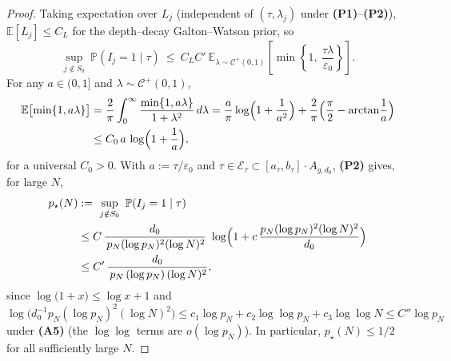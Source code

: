\documentclass[11pt]{article}
\theoremstyle{plain}
\theoremstyle{definition}
\theoremstyle{plain}
\begin{document}
\begin{proof}
Taking expectation over $L_j$ (independent of $(\tau,\lambda_j)$ under {\textbf{(P1)}}–{\textbf{(P2)}}),
$\mathbb E[L_j]\le C_L$ for the depth–decay Galton–Watson prior, so
\[
\sup_{j\notin S_0}\ \mathbb P(I_j=1\mid \tau)
\ \le\ C_L C'\ \mathbb E_{\lambda\sim\mathcal C^+(0,1)}\!\left[\min\!\left\{1,\ \frac{\tau\lambda}{\varepsilon_0}\right\}\right].
\]
For any $a\in(0,1]$ and $\lambda\sim\mathcal C^+(0,1)$,
\begin{equation}\label{eq:min-logineq}
\begin{split}
\mathbb E\bigl[\min\{1,a\lambda\}\bigr]
&=\frac{2}{\pi}\int_0^\infty \frac{\min\{1,a\lambda\}}{1+\lambda^2}\,d\lambda
=\frac{a}{\pi}\log \Bigl(1+\frac{1}{a^2}\Bigr)+\frac{2}{\pi}\Bigl(\frac{\pi}{2}-\arctan\!\frac{1}{a}\Bigr)\\
&\le C_0\,a\,\log \Bigl(1+\frac{1}{a}\Bigr),
\end{split}
\end{equation}
for a universal $C_0>0$.
With $a:=\tau/\varepsilon_0$ and $\tau\in\mathcal E_\tau\subset [a_\tau,b_\tau]\cdot A_{g,d_0}$, {\textbf{(P2)}} gives, for large $N$,
\begin{align}
p_\star(N)
&:=\ \sup_{j\notin S_0}\ \mathbb P(I_j=1\mid \tau)\nonumber\\
&\le C\,\frac{d_0}{\,p_N(\log p_N)^2(\log N)^2}\ \log\Bigl(1+c\,\frac{p_N(\log p_N)^2(\log N)^2}{d_0}\Bigr)\nonumber\\
&\le C'\,\frac{d_0}{\,p_N\,(\log p_N)\,(\log N)^2},\label{eq:pstar-new}
\end{align}
since $\log\!\big(1+x\big)\le \log x + 1$ and
$\log\!\big(d_0^{-1}{p_N(\log p_N)^2(\log N)^2}\big)
\le c_1\log p_N + c_2\log\log p_N + c_3\log\log N
\le C''\log p_N$ under {\textbf{(A5)}} (the $\log\log$ terms are $o(\log p_N)$).
In particular, $p_\star(N)\le 1/2$ for all sufficiently large $N$.


\end{proof}
\end{document}
